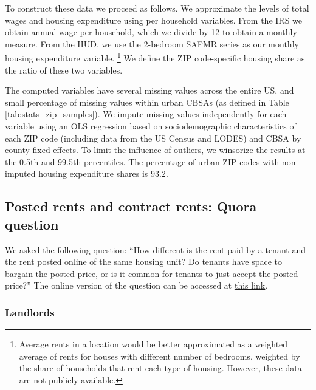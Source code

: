 To construct these data we proceed as follows.
We approximate the levels of total wages and housing expenditure using per 
household variables.
From the IRS we obtain annual wage per household, which we 
divide by 12 to obtain a monthly measure.
From the HUD, we use the 2-bedroom SAFMR series as our monthly housing 
expenditure variable.%
\footnote{Average rents in a location would be better approximated as a
weighted average of rents for houses with different number of bedrooms,
weighted by the share of households that rent each type of housing.
However, these data are not publicly available.}
We define the ZIP code-specific housing share as the ratio of these two 
variables.

The computed variables have several missing values across the entire US, and 
small percentage of missing values within urban CBSAs 
(as defined in Table \ref{tab:stats_zip_samples}).
We impute missing values independently for each variable using an OLS
regression based on sociodemographic characteristics of each ZIP code 
(including data from the US Census and LODES) and CBSA by county fixed effects.
To limit the influence of outliers, we winsorize the results at the 0.5th and 
99.5th percentiles. 
The percentage of urban ZIP codes with non-imputed housing expenditure shares 
is $93.2$.
%
%

\subsection{Posted rents and contract rents: Quora question}
\label{sec:posted_rents}
	
We asked the following question: ``How different is the rent paid by a tenant 
and the rent posted online of the same housing unit? Do tenants have space 
to bargain the posted price, or is it common for tenants to just accept the
posted price?''
The online version of the question can be accessed at
\href{https://www.quora.com/How-different-is-the-rent-paid-by-a-tenant-and-the-rent-posted-online-of-the-same-housing-unit-Do-tenants-have-space-to-bargain-the-posted-price-or-is-it-common-for-tenants-to-just-accept-the-posted-price}{\underline{this link}}.

\subsubsection*{Landlords}

